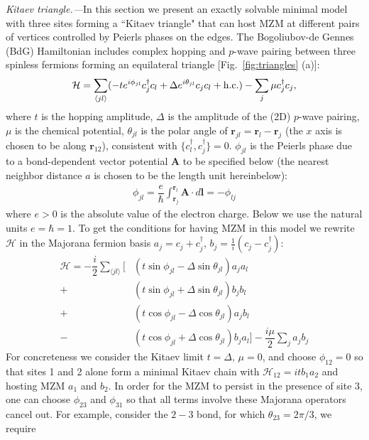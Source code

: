 \documentclass[aps,prb,showpacs,amsmath,twocolumn,amssymb,superscriptaddress]{revtex4-2}
\renewcommand{\vec}[1]{\mathbf{#1}}
\newcommand{\ham}{\mathcal{H}}
\newcommand{\cc}{c^{\dagger}}
\newcommand{\de}{\Delta}
\begin{document}
\emph{Kitaev triangle.---}In this section we present an exactly solvable minimal model with three sites forming a ``Kitaev triangle" that can host MZM at different pairs of vertices controlled by Peierls phases on the edges. The Bogoliubov-de Gennes (BdG) Hamiltonian includes complex hopping and $p$-wave pairing between three spinless fermions forming an equilateral triangle [Fig.~\ref{fig:triangles} (a)]:
\begin{equation}\label{eq:HBdG}
  \ham = \sum_{\langle j l \rangle} (-te^{i\phi_{jl}}\cc_{j} c_l + \de e^{i\theta_{jl}} c_{j} c_l + {\rm h.c.}) - \sum_{j} \mu \cc_j c_j,
\end{equation}
where $t$ is the hopping amplitude, $\de$ is the amplitude of the (2D) $p$-wave pairing, $\mu$ is the chemical potential, $\theta_{jl}$ is the polar angle of $\mathbf r_{jl} = \mathbf r_l - \mathbf r_j$ (the $x$ axis is chosen to be along $\mathbf r_{12}$), consistent with $\{c^\dag_l, c^\dag_j\} = 0$. $\phi_{jl}$ is the Peierls phase due to a bond-dependent vector potential $\mathbf A$ to be specified below (the nearest neighbor distance $a$ is chosen to be the length unit hereinbelow):
\begin{eqnarray}
\phi_{jl} = \dfrac{e}{\hbar} \int_{\mathbf r_j}^{\mathbf r_{l}} \vec{A} \cdot d\vec{l} = -\phi_{lj}
\end{eqnarray}
where $e>0$ is the absolute value of the electron charge. Below we use the natural units $e=\hbar=1$. To get the conditions for having MZM in this model we rewrite $\mathcal{H}$ in the Majorana fermion basis $a_{j} = c_j + c^\dag_j$, $b_j = \frac{1}{i}(c_j - c^\dag_j)$:
\begin{align}\label{eq:H3M}
    \ham =  -\dfrac{i}{2} \sum_{\langle j l \rangle} \Big[&\left(t\sin\phi_{jl}-\de\sin\theta_{jl}\right) a_j a_l \\\nonumber
  +&\left(t\sin\phi_{jl}+\de\sin\theta_{jl}\right) b_j b_l  \\\nonumber
  +&\left(t\cos\phi_{jl} - \de\cos\theta_{jl}\right) a_j b_l  \\\nonumber
  -&\left(t\cos\phi_{jl}+\de\cos\theta_{jl}\right) b_j a_l\Big]  -\dfrac{i\mu}{2} \sum_j  a_j b_j
\end{align}
For concreteness we consider the Kitaev limit $t=\de$, $\mu=0$, and choose $\phi_{12} = 0$ so that sites 1 and 2 alone form a minimal Kitaev chain with $\mathcal{H}_{12} = itb_1a_2$ and hosting MZM $a_1$ and $b_2$. In order for the MZM to persist in the presence of site 3, one can choose $\phi_{23}$ and $\phi_{31}$ so that all terms involve these Majorana operators cancel out. For example, consider the $2-3$ bond, for which $\theta_{23} = 2\pi/3$, we require
\end{document}
